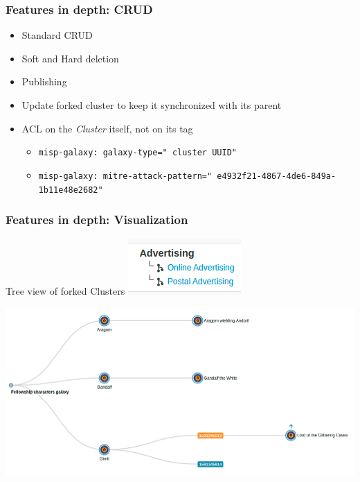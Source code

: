 \begin{frame}
    \frametitle{Features in depth: CRUD}
    \begin{itemize}
        \item Standard CRUD
        \item Soft and Hard deletion
        \item Publishing
        \item Update forked cluster to keep it synchronized with its parent
        \item ACL on the \textit{Cluster} itself, not on its tag
        \begin{itemize}
            \item \texttt{misp-galaxy:{\color{blue} galaxy-type}="{\color{red} cluster UUID}"}
            \item \texttt{\tiny misp-galaxy:{\color{blue} mitre-attack-pattern}="{\color{red} e4932f21-4867-4de6-849a-1b11e48e2682}"}
        \end{itemize}
    \end{itemize}
\end{frame}

\begin{frame}
    \frametitle{Features in depth: Visualization}
    Tree view of forked Clusters \includegraphics[scale=0.5]{pics/cluster-forks}


    \includegraphics[width=1.0\linewidth]{pics/cluster-forks-tree}
\end{frame}

